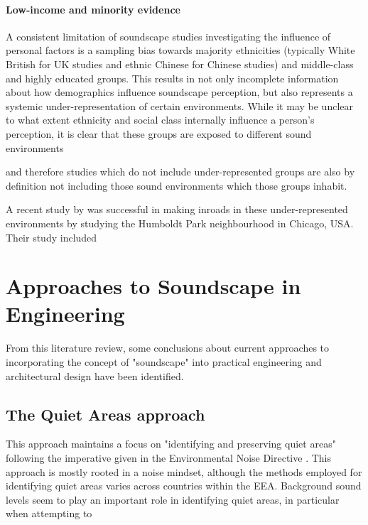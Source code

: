 \paragraph*{Low-income and minority evidence} %
A consistent limitation of soundscape studies investigating the influence of personal factors is a sampling bias towards majority ethnicities (typically White British for UK studies and ethnic Chinese for Chinese studies) and middle-class and highly educated groups. %
This results in not only incomplete information about how demographics influence soundscape perception, but also represents a systemic under-representation of certain environments. While it may be unclear to what extent ethnicity and social class internally influence a person's perception, it is clear that these groups are exposed to different sound environments %

and therefore studies which do not include under-represented groups are also by definition not including those sound environments which those groups inhabit.

A recent study by  was successful in making inroads in these under-represented environments by studying the Humboldt Park neighbourhood in Chicago, USA. Their study included


\section{Approaches to Soundscape in Engineering}

From this literature review, some conclusions about current approaches to incorporating the concept of "soundscape" into practical engineering and architectural design have been identified.

\subsection{The Quiet Areas approach}

This approach maintains a focus on "identifying and preserving quiet areas"  following the imperative given in the Environmental Noise Directive . This approach is mostly rooted in a noise mindset, although the methods employed for identifying quiet areas varies across countries within the EEA. Background sound levels seem to play an important role in identifying quiet areas, in particular when attempting to

